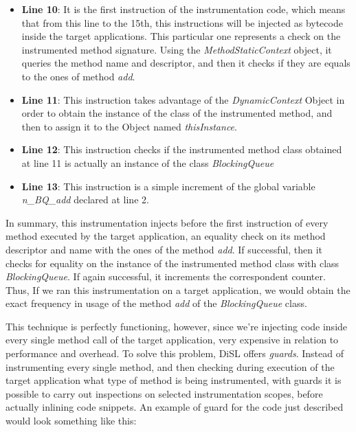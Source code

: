\documentclass[]{usiinfthesis}
\begin{document}
\begin{itemize}
    \item \textbf{Line 10}: It is the first instruction of the instrumentation code, which means that from this line to the 15th, this instructions will be injected as bytecode inside the target applications. This particular one represents a check on the instrumented method signature. Using the \textit{MethodStaticContext} object, it queries the method name and descriptor, and then it checks if they are equals to the ones of method \textit{add}.
    
    \item \textbf{Line 11}: This instruction takes advantage of the \textit{DynamicContext} Object in order to obtain the instance of the class of the instrumented method, and then to assign it to the Object named \textit{thisInstance}.
    
    \item \textbf{Line 12}: This instruction checks if the instrumented method class obtained at line 11 is actually an instance of the class \textit{BlockingQueue}
    
    \item \textbf{Line 13}: This instruction is a simple increment of the global variable \textit{n\_BQ\_add} declared at line 2.
\end{itemize}
In summary, this instrumentation injects before the first instruction of every method executed by the target application, an equality check on its method descriptor and name with the ones of the method \textit{add}. If successful, then it checks for equality on the instance of the instrumented method class with class \textit{BlockingQueue}. If again successful, it increments the correspondent counter. Thus, If we ran this instrumentation on a target application, we would obtain the exact frequency in usage of the method \textit{add} of the \textit{BlockingQueue} class. 

\noindent
This technique is perfectly functioning, however, since we're injecting code inside every single method call of the target application, very expensive in relation to performance and overhead. To solve this problem, DiSL offers \textit{guards}. Instead of instrumenting every single method, and then checking during execution of the target application what type of method is being instrumented, with guards it is possible to carry out inspections on selected instrumentation scopes, before actually inlining code snippets. An example of guard for the code just described would look something like this:
\end{document}
